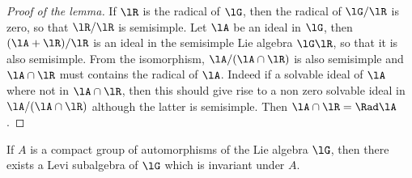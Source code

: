 \begin{proof}[Proof of the lemma]
	If $\lR$ is the radical of $\lG$, then the radical of $\lG/\lR$ is zero, so that $\lR/\lR$ is semisimple. Let $\lA$ be an ideal in $\lG$, then $(\lA+\lR)/\lR$ is an ideal in the semisimple Lie algebra $\lG\lR$, so that it is also semisimple. From the isomorphism, $\lA/(\lA\cap\lR)$ is also semisimple and $\lA\cap\lR$ must contains the radical of $\lA$. Indeed if a solvable ideal of $\lA$ where not in $\lA\cap\lR$, then this should give rise to a non zero solvable ideal in $\lA/(\lA\cap\lR)$ although the latter is semisimple. Then $\lA\cap\lR=\Rad\lA$.
\end{proof}

\begin{proposition}
	If $A$ is a compact group of automorphisms of the Lie algebra $\lG$, then there exists a Levi subalgebra of $\lG$ which is invariant under $A$.
\end{proposition}

